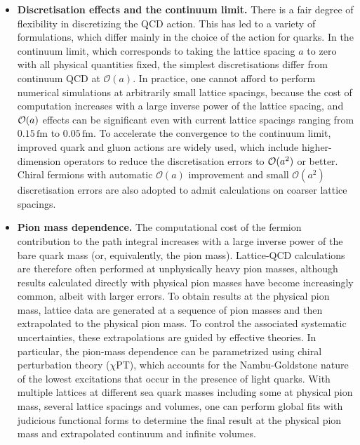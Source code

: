 \begin{itemize}

\item {\bfseries Discretisation effects and the continuum limit.} There is 
a fair degree of flexibility in discretizing the QCD action. This has
led to a variety of formulations, which differ mainly in the choice of
the action for quarks.
%
In the continuum limit, which corresponds to taking
the lattice spacing $a$ to zero with all physical quantities fixed,
the simplest discretisations differ from continuum QCD at ${\mathcal
O}(a)$.
%
In practice, one cannot afford to perform numerical
simulations at arbitrarily small lattice spacings, because the cost of
computation increases with a large inverse power of the lattice
spacing, and ${\cal O}(a)$ effects can be significant even
with current lattice spacings ranging from $0.15 \,\mbox{fm}$ to
$0.05 \,\mbox{fm}$.
%
To accelerate the convergence to the continuum
limit, improved quark and gluon actions are widely used, which include
higher-dimension operators to reduce the discretisation errors to
${\cal O}(a^2)$ or better.
%
Chiral fermions with automatic $\mathcal{O}(a)$ improvement and small 
$\mathcal{O}(a^2)$ discretisation errors are also adopted to admit 
calculations on coarser lattice spacings. 

\item {\bfseries Pion mass dependence.} 
The computational cost of the fermion contribution to the path
integral increases with a large inverse power of the bare quark mass
(or, equivalently, the pion mass).
%
Lattice-QCD calculations are therefore
often performed at unphysically heavy pion masses, although results calculated
directly with physical pion masses have become increasingly common, albeit with larger
errors.
%
To obtain results at the physical pion mass, lattice data are
generated at a sequence of pion masses and then extrapolated to the
physical pion mass.
%
To control the associated systematic
uncertainties, these extrapolations are guided by effective
theories.
%
In particular, the pion-mass dependence can be parametrized
using chiral perturbation theory ($\chi$PT), which accounts for the
Nambu-Goldstone nature of the lowest excitations that occur in the
presence of light quarks. 
%
With multiple lattices at different sea quark masses including some
at physical pion mass, several lattice spacings and volumes, one can  
perform global fits with judicious functional forms to determine
the final result at the physical pion mass and extrapolated continuum and 
infinite volumes.


\end{itemize}
